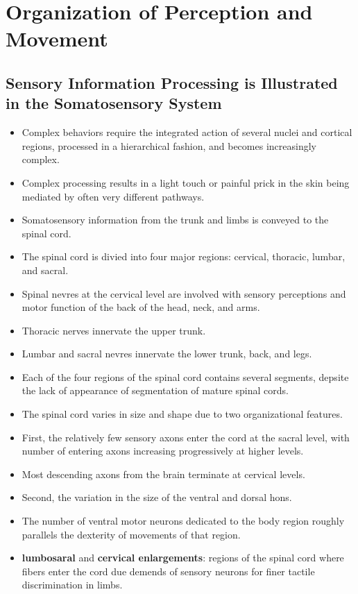 \documentclass[12pt,a4paper]{article}
\begin{document}
\clearpage
\section{Organization of Perception and Movement}
\subsection{Sensory Information Processing is Illustrated in the Somatosensory System}
\begin{itemize}
    \item Complex behaviors require the integrated action of several nuclei and cortical regions, processed in a hierarchical fashion, and becomes increasingly complex.
    \item Complex processing results in a light touch or painful prick in the skin being mediated by often very different pathways.
    \item Somatosensory information from the trunk and limbs is conveyed to the spinal cord.
    \item The spinal cord is divied into four major regions: cervical, thoracic, lumbar, and sacral.
    \item Spinal nevres at the cervical level are involved with sensory perceptions and motor function of the back of the head, neck, and arms.
    \item Thoracic nerves innervate the upper trunk.
    \item Lumbar and sacral nevres innervate the lower trunk, back, and legs.
    \item Each of the four regions of the spinal cord contains several segments, depsite the lack of appearance of segmentation of mature spinal cords.  
    \item The spinal cord varies in size and shape due to two organizational features.
    \item First, the relatively few sensory axons enter the cord at the sacral level, with number of entering axons increasing progressively at higher levels.
    \item Most descending axons from the brain terminate at cervical levels.
    \item Second, the variation in the size of the ventral and dorsal hons.
    \item The number of ventral motor neurons dedicated to the body region roughly parallels the dexterity of movements of that region.
    \item \textbf{lumbosaral} and \textbf{cervical enlargements}: regions of the spinal cord where fibers enter the cord due demends of sensory neurons for finer tactile discrimination in limbs.

\end{itemize}
\end{document}
